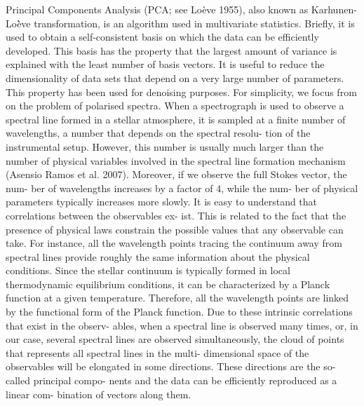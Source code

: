Principal Components Analysis (PCA; see Loève 1955), also known as
Karhunen-Lo\`ève transformation, is an algorithm used in multivariate statistics.
Briefly, it is used to obtain a self-consistent basis on which the data can be efficiently 
developed. This basis has the property that the largest amount of variance is explained with 
the least number of basis vectors. It is useful to reduce the dimensionality of data sets 
that depend on a very large number of parameters. This property has been used for 
denoising purposes.
For simplicity, we focus from on the problem of polarised spectra. When a spectrograph is used to observe a spectral line formed in a stellar atmosphere, it is sampled at a finite number of wavelengths, a number that depends on the spectral resolu- tion of the instrumental setup. However, this number is usually much larger than the number of physical variables involved in the spectral line formation mechanism (Asensio Ramos et al. 2007). Moreover, if we observe the full Stokes vector, the num- ber of wavelengths increases by a factor of 4, while the num- ber of physical parameters typically increases more slowly. It is easy to understand that correlations between the observables ex- ist. This is related to the fact that the presence of physical laws constrain the possible values that any observable can take. For instance, all the wavelength points tracing the continuum away from spectral lines provide roughly the same information about the physical conditions. Since the stellar continuum is typically formed in local thermodynamic equilibrium conditions, it can be characterized by a Planck function at a given temperature. Therefore, all the wavelength points are linked by the functional form of the Planck function.
Due to these intrinsic correlations that exist in the observ- ables, when a spectral line is observed many times, or, in our case, several spectral lines are observed simultaneously, the cloud of points that represents all spectral lines in the multi- dimensional space of the observables will be elongated in some directions. These directions are the so-called principal compo- nents and the data can be efficiently reproduced as a linear com- bination of vectors along them.

